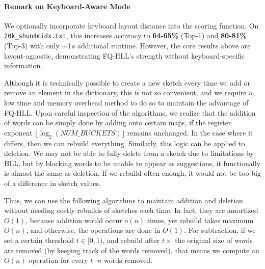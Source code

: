 \documentclass[12pt,a4paper]{article}
\begin{document}
\paragraph{Remark on Keyboard-Aware Mode}
We optionally incorporate keyboard layout distance into the scoring function. On \texttt{20k\_shun4midx.txt}, this increases accuracy to \textbf{64-65\%} (Top-1) and \textbf{80-81\%} (Top-3) with only $\sim$1\,s additional runtime. However, the core results above are layout-agnostic, demonstrating FQ-HLL's strength without keyboard-specific information. \newline

Although it is technically possible to create a new sketch every time we add or remove an element in the dictionary, this is not so convenient, and we require a low time and memory overhead method to do so to maintain the advantage of FQ-HLL. Upon careful inspection of the algorithms, we realize that the addition of words can be simply done by adding onto certain maps, if the register exponent $\lfloor \log_2 (NUM\_BUCKETS) \rfloor$ remains unchanged. In the case where it differs, then we can rebuild everything. Similarly, this logic can be applied to deletion. We may not be able to fully delete from a sketch due to limitations by HLL, but by blocking words to be unable to appear as suggestions, it functionally is almost the same as deletion. If we rebuild often enough, it would not be too big of a difference in sketch values. \newline

Thus, we can use the following algorithms to maintain addition and deletion without needing costly rebuilds of sketches each time. In fact, they are amortized $O(1)$, because addition would occur $o(n)$ times, yet rebuild takes maximum $O(n)$, and otherwise, the operations are done in $O(1)$. For subtraction, if we set a certain threshold $t \in [0, 1)$, and rebuild after $t\times$ the original size of words are removed (by keeping track of the words removed), that means we compute an $O(n)$ operation for every $t \cdot n$ words removed. \newline
\end{document}
